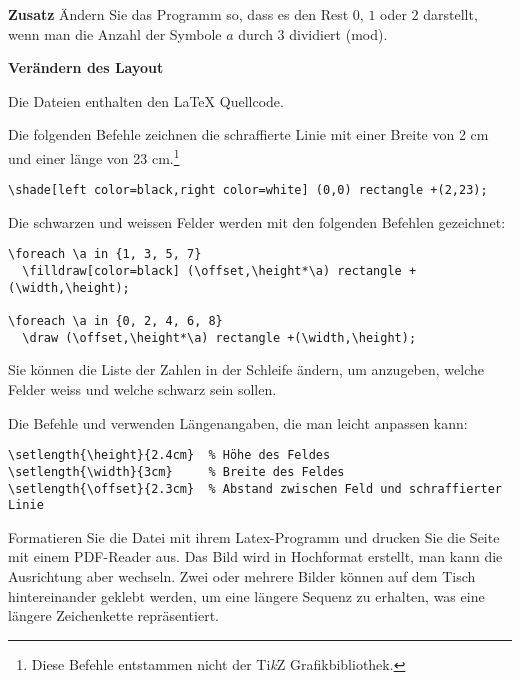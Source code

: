 \textbf{Zusatz} Ändern Sie das Programm so, dass es den Rest $0$, $1$ oder $2$ darstellt, wenn man die Anzahl der Symbole $a$ durch $3$ dividiert (mod).

\bigskip

\textbf{Verändern des Layout}


Die Dateien  enthalten den \LaTeX{} Quellcode.

Die folgenden Befehle zeichnen die schraffierte Linie mit einer Breite von 2 cm und einer länge von 23 cm.\footnote{Diese Befehle entstammen nicht der Ti\textit{k}Z
Grafikbibliothek.}
\begin{footnotesize}
\begin{verbatim}
\shade[left color=black,right color=white] (0,0) rectangle +(2,23);
\end{verbatim}
\end{footnotesize}

Die schwarzen und weissen Felder werden mit den folgenden Befehlen gezeichnet:  
\begin{footnotesize}
\begin{verbatim}
\foreach \a in {1, 3, 5, 7}
  \filldraw[color=black] (\offset,\height*\a) rectangle +(\width,\height);

\foreach \a in {0, 2, 4, 6, 8}
  \draw (\offset,\height*\a) rectangle +(\width,\height);
\end{verbatim}
\end{footnotesize}
Sie können die Liste der Zahlen in der Schleife  ändern, um anzugeben, welche Felder weiss und welche schwarz sein sollen. 

Die Befehle  und  verwenden Längenangaben, die man leicht anpassen kann:
\begin{footnotesize}
\begin{verbatim}
\setlength{\height}{2.4cm}  % Höhe des Feldes
\setlength{\width}{3cm}     % Breite des Feldes 
\setlength{\offset}{2.3cm}  % Abstand zwischen Feld und schraffierter Linie
\end{verbatim}
\end{footnotesize}

Formatieren Sie die Datei mit ihrem Latex-Programm und drucken Sie die Seite mit einem PDF-Reader aus. Das Bild wird in Hochformat erstellt, man kann die Ausrichtung aber wechseln. Zwei oder mehrere Bilder können auf dem Tisch hintereinander geklebt werden, um eine längere Sequenz zu erhalten, was eine längere Zeichenkette repräsentiert.
